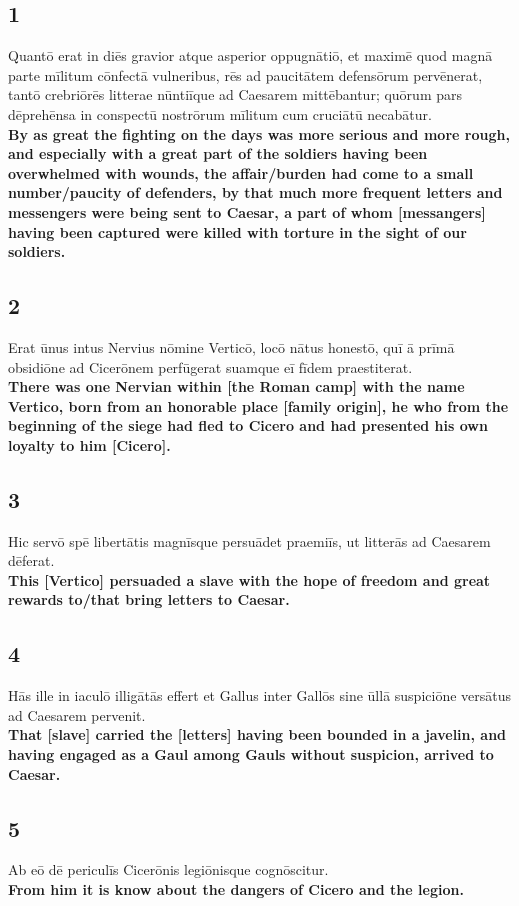 \documentclass{article}
\begin{document}
\subsection*{1}
Quantō erat in diēs gravior atque asperior oppugnātiō, et maximē quod magnā parte mīlitum cōnfectā vulneribus, rēs ad paucitātem defensōrum pervēnerat, tantō crebriōrēs litterae nūntiīque ad Caesarem mittēbantur; quōrum pars dēprehēnsa in conspectū nostrōrum mīlitum cum cruciātū necabātur. \\
\textbf{By as great the fighting on the days was more serious and more rough, and especially with a great part of the soldiers having been overwhelmed with wounds, the affair/burden had come to a small number/paucity of defenders, by that much more frequent letters and messengers were being sent to Caesar, a part of whom [messangers] having been captured were killed with torture in the sight of our soldiers.}

\subsection*{2}
Erat ūnus intus Nervius nōmine Verticō, locō nātus honestō, quī ā prīmā obsidiōne ad Cicerōnem perfūgerat suamque eī fīdem praestiterat. \\
\textbf{There was one Nervian within [the Roman camp] with the name Vertico, born from an honorable place [family origin], he who from the beginning of the siege had fled to Cicero and had presented his own loyalty to him [Cicero].}

\subsection*{3}
Hic servō spē libertātis magnīsque persuādet praemiīs, ut litterās ad Caesarem dēferat. \\
\textbf{This [Vertico] persuaded a slave with the hope of freedom and great rewards to/that bring letters to Caesar.}

\subsection*{4}
Hās ille in iaculō illigātās effert et Gallus inter Gallōs sine ūllā suspiciōne versātus ad Caesarem pervenit. \\
\textbf{That [slave] carried the [letters] having been bounded in a javelin, and having engaged as a Gaul among Gauls without suspicion, arrived to Caesar.}

\subsection*{5}
Ab eō dē periculīs Cicerōnis legiōnisque cognōscitur.\\
\textbf{From him it is know about the dangers of Cicero and the legion.}
\end{document}
